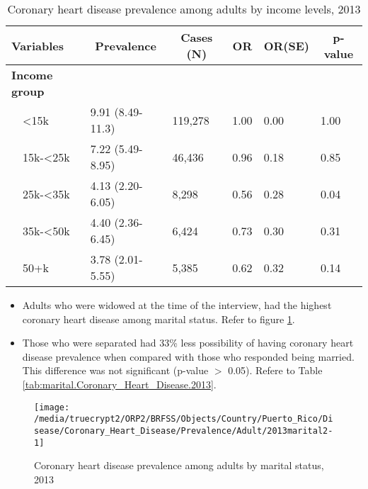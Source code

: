 \begin{table}[H]
\caption{Coronary heart disease prevalence  among adults by income levels, 2013\label{tab:income.Coronary_Heart_Disease.2013}} 
\begin{center}
\begin{tabular}{llllll}
\hline\hline
\multicolumn{1}{l}{Variables}&\multicolumn{1}{c}{Prevalence}&\multicolumn{1}{c}{Cases (N)}&\multicolumn{1}{c}{OR}&\multicolumn{1}{c}{OR(SE)}&\multicolumn{1}{c}{p-value}\tabularnewline
\hline
{\bfseries Income group}&&&&&\tabularnewline
~~\textless15k&9.91 (8.49-11.3)&119,278&1.00&0.00&1.00\tabularnewline
~~15k-\textless25k&7.22 (5.49-8.95)& 46,436&0.96&0.18&0.85\tabularnewline
~~25k-\textless35k&4.13 (2.20-6.05)&  8,298&0.56&0.28&0.04\tabularnewline
~~35k-\textless50k&4.40 (2.36-6.45)&  6,424&0.73&0.30&0.31\tabularnewline
~~50+k&3.78 (2.01-5.55)&  5,385&0.62&0.32&0.14\tabularnewline
\hline
\end{tabular}\end{center}

\end{table}

 \newpage
\begin{itemize}

\item Adults who were 
widowed at the time of the interview, had the highest coronary heart disease among marital status. Refer to figure \ref{fig:marital.Coronary_Heart_Disease.2013}.

\item Those who were separated had 33\% less possibility of having coronary heart disease prevalence when compared with those who responded being married. This difference was not significant (p-value $>$ 0.05). Refere to Table \ref{tab:marital.Coronary_Heart_Disease.2013}.

\end{itemize}

\begin{figure}[H]
\caption{Coronary heart disease prevalence among adults by marital status,
         2013}
\label{fig:marital.Coronary_Heart_Disease.2013}
\begin{knitrout}
\color{fgcolor}

{\centering \texttt{[image: /media/truecrypt2/ORP2/BRFSS/Objects/Country/Puerto\_Rico/Disease/Coronary\_Heart\_Disease/Prevalence/Adult/2013marital2-1]} 

}



\end{knitrout}
 \end{figure}

